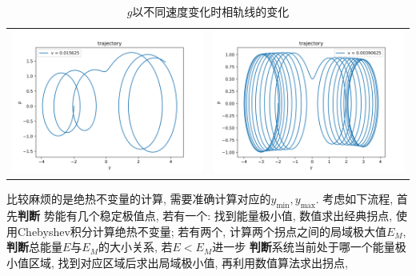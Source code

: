 \documentclass[a4paper,zihao=5,UTF8]{ctexart}
\newcommand{\mr}[1]{\mathrm{#1}}
\begin{document}
\begin{table}[htbp]
\begin{tabular}[htbp]{cc}
            \includegraphics[scale=0.5]{3_traj_v=0_015625.png} & \includegraphics[scale=0.5]{3_traj_v=0_00390625.png}
        \end{tabular}
        \caption{$g$以不同速度变化时相轨线的变化}
        \label{g change}
    \end{table}
    \par 
    比较麻烦的是绝热不变量的计算, 需要准确计算对应的$y_\mr{min}, y_\mr{max}$. 考虑如下流程, 首先\textbf{判断}
    势能有几个稳定极值点, 若有一个: 找到能量极小值, 数值求出经典拐点, 使用Chebyshev积分计算绝热不变量; 若有两个, 
    计算两个拐点之间的局域极大值$E_M$, \textbf{判断}总能量$E$与$E_M$的大小关系, 若$E<E_M$进一步
    \textbf{判断}系统当前处于哪一个能量极小值区域, 找到对应区域后求出局域极小值, 再利用数值算法求出拐点,
\end{document}
